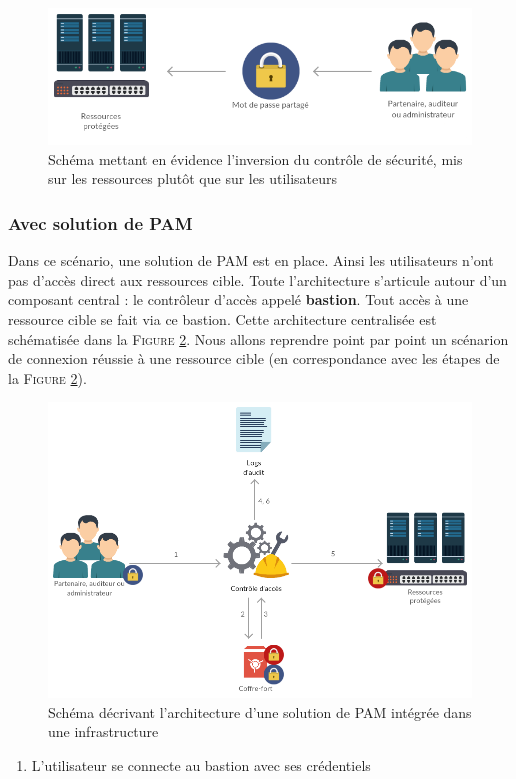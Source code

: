 \begin{figure}[!ht]
    \center
    \includegraphics[width=\textwidth]{./images/ressource_centered.png}
    \caption{Schéma mettant en évidence l'inversion du contrôle de sécurité, mis sur les ressources plutôt que sur les utilisateurs}
    \label{fig:invcont}
\end{figure}

\subsubsection{Avec solution de PAM}
\label{par:withpam}

Dans ce scénario, une solution de PAM est en place. Ainsi les utilisateurs n'ont pas d'accès direct aux ressources cible. Toute l'architecture s'articule autour d'un composant central : le contrôleur d'accès appelé \textbf{bastion}. Tout accès à une ressource cible se fait via ce bastion. Cette architecture centralisée est schématisée dans la \textsc{Figure} \ref{fig:schempam}. Nous allons reprendre point par point un scénarion de connexion réussie à une ressource cible (en correspondance avec les étapes de la \textsc{Figure} \ref{fig:schempam}).

\begin{figure}[!ht]
    \center
    \includegraphics[width=\textwidth]{./images/Schema_PAM.png}
    \caption{Schéma décrivant l'architecture d'une solution de PAM intégrée dans une infrastructure}
    \label{fig:schempam}
\end{figure}

\begin{enumerate}
	\item L'utilisateur se connecte au bastion avec ses crédentiels
\end{enumerate}
